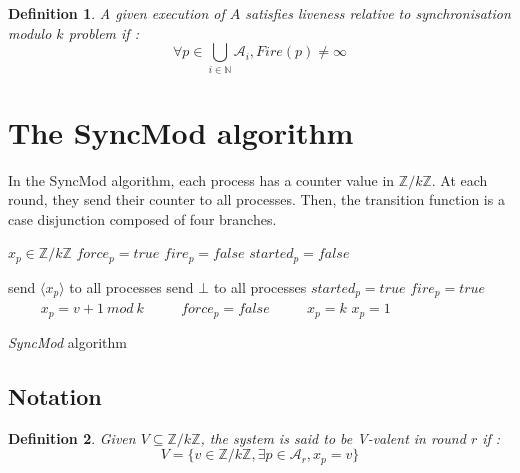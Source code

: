 \documentclass{article}
\newtheorem{definition}{Definition}
\begin{document}
\begin{definition}
	A given execution of $A$ satisfies liveness relative to synchronisation modulo $k$ problem if :
	$$\forall p \in \bigcup\limits_{i \in \mathds{N}} \mathcal{A}_i, Fire(p) \neq \infty$$
\end{definition}

\section{The SyncMod algorithm}

In the SyncMod algorithm, each process has a counter value in $\mathds{Z}/k\mathds{Z}$. At each round,
they send their counter to all processes.
Then, the transition function is a case disjunction composed of four branches.

\begin{algorithm}[htb]
\begin{distribalgo}[1]
\BLANK {}
	\STATE $x_p \in \mathds{Z}/k\mathds{Z}$
	\STATE $force_p = true$
	\STATE $fire_p = false$
	\STATE $started_p = false$

\ENDINDENT \BLANK

			\STATE send $\langle x_p \rangle$ to all processes
		\ELSE
			\STATE send $\bot$ to all processes
		\ENDIF
	\ENDINDENT
	\BLANK
		\STATE $started_p = true$
			\STATE $fire_p = true$ ~~~~
		\ENDIF
			\STATE $x_p = v+1~mod~k$ ~~~~
			\STATE $force_p = false$ ~~~~
			\STATE $x_p = k$
		\ELSE
			\STATE $x_p = 1$ ~~~~
		\ENDIF
	\ENDINDENT
\ENDINDENT 
\caption{{\em SyncMod} algorithm} \label{algo:R}
\end{distribalgo}

\end{algorithm}

\subsection{Notation}

\begin{definition}
	Given $V \subseteq \mathds{Z}/k\mathds{Z}$, the system is said to be V-valent in round $r$ if :
	$$V = \{v \in \mathds{Z}/k\mathds{Z}, \exists p \in \mathcal{A}_r, x_p = v\}$$
\end{definition}
\end{document}

